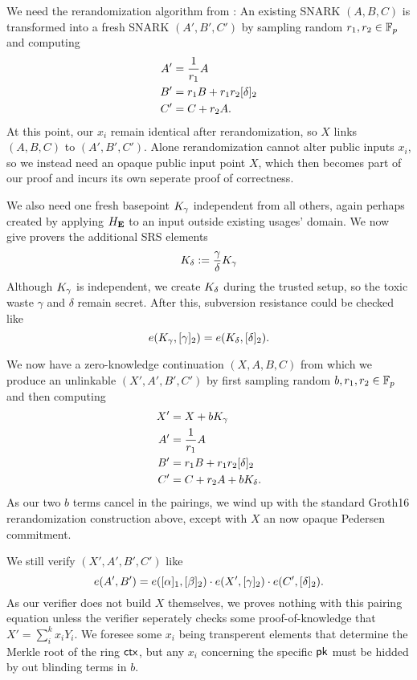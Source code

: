 We need the rerandomization algorithm from \cite[Fig.~1]{RandomizationGroth16}:
An existing SNARK $(A,B,C)$ is transformed into a fresh
SNARK $(A',B',C')$ by sampling random $r_1,r_2 \in \mathbb{F}_p$ and computing
$$ \begin{aligned}
A' &= {1 \over r_1} A \\
B' &= r_1 B + r_1 r_2 [\delta]_2 \\
C' &= C + r_2 A . \\
\end{aligned} $$
At this point, our $x_i$ remain identical after rerandomization,
so $X$ links $(A,B,C)$ to $(A',B',C')$.
Alone rerandomization cannot alter public inputs $x_i$, so
we instead need an opaque public input point $X$, which then becomes
part of our proof and incurs its own seperate proof of correctness.

We also need one fresh basepoint $K_\gamma$ independent from all others,
again perhaps created by applying $H_{\mathbf{E}}$ to an input outside existing usages' domain.
We now give provers the additional SRS elements
$$ K_\delta := {\gamma\over\delta} K_\gamma $$
Although $K_\gamma$ is independent, 
we create $K_\delta$ during the trusted setup,
 so the toxic waste $\gamma$ and $\delta$ remain secret.
After this, subversion resistance could be checked like 
$$ e(K_\gamma, [\gamma]_2) = e(K_\delta, [\delta]_2) . $$

We now have a zero-knowledge continuation $(X,A,B,C)$ from which
we produce an unlinkable $(X',A',B',C')$ by
 first sampling random $b,r_1,r_2 \in \mathbb{F}_p$ and then computing
$$ \begin{aligned}
X' &= X + b K_\gamma \\
A' &= {1 \over r_1} A \\
B' &= r_1 B + r_1 r_2 [\delta]_2 \\
C' &= C + r_2 A + b K_\delta . \\
\end{aligned} $$
As our two $b$ terms cancel in the pairings, we wind up with the
standard Groth16 rerandomization construction above,
 except with $X$ an now opaque Pedersen commitment.


We still verify $(X',A',B',C')$ like 
$$ e(A',B') = e([\alpha]_1, [\beta]_2) \cdot
 e(X', [\gamma]_2) \cdot e(C', [\delta]_2) . $$
As our verifier does not build $X$ themselves, we proves nothing
with this pairing equation unless the verifier seperately checks
 some proof-of-knowledge that $X' = \sum_i^k x_i Y_i$.
We foresee some $x_i$ being transperent elements that determine the
Merkle root of the ring $\mathsf{ctx}$, but any $x_i$ concerning the
 specific $\mathsf{pk}$ must be hidded by out blinding terms in $b$.

